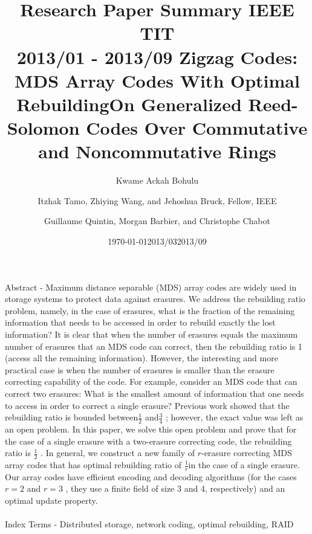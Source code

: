 \documentclass[fontsize=12pt]{article}
\title{Research Paper Summary IEEE TIT \\2013/01 - 2013/09 }
\author{Kwame Ackah Bohulu}
\date{\today}
\begin{document}
\maketitle

\newpage
\title{Zigzag Codes: MDS Array Codes
With Optimal Rebuilding}
\author{Itzhak Tamo, Zhiying Wang, and Jehoshua Bruck, Fellow, IEEE}
\date{2013/03}
\maketitle

Abstract - Maximum distance separable (MDS) array codes are
widely used in storage systems to protect data against erasures. We
address the rebuilding ratio problem, namely, in the case of erasures,
what is the fraction of the remaining information that needs
to be accessed in order to rebuild exactly the lost information? It
is clear that when the number of erasures equals the maximum
number of erasures that an MDS code can correct, then the rebuilding
ratio is 1 (access all the remaining information). However,
the interesting and more practical case is when the number of erasures
is smaller than the erasure correcting capability of the code.
For example, consider an MDS code that can correct two erasures:
What is the smallest amount of information that one needs to access
in order to correct a single erasure? Previous work showed
that the rebuilding ratio is bounded between$\frac{1}{2}$ and$\frac{3}{4}$ 
; however,
the exact value was left as an open problem. In this paper, we solve
this open problem and prove that for the case of a single erasure
with a two-erasure correcting code, the rebuilding ratio is $\frac{1}{2}$ . In
general, we construct a new family of $r$-erasure correcting MDS
array codes that has optimal rebuilding ratio of $\frac{1}{r}$in the case of
a single erasure. Our array codes have efficient encoding and decoding
algorithms (for the cases $r=2$ and $r=3$ , they use a finite
field of size 3 and 4, respectively) and an optimal update property.
\paragraph{}
Index Terms - Distributed storage, network coding, optimal rebuilding,
RAID

\newpage
\title{On Generalized Reed-Solomon Codes Over
Commutative and Noncommutative Rings}
\author{Guillaume Quintin, Morgan Barbier, and Christophe Chabot}
\date{2013/09}
\maketitle
\end{document}
